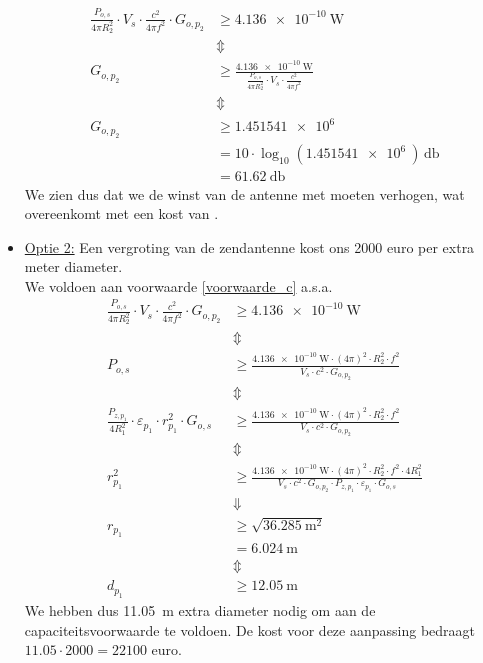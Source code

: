 \documentclass[kulak]{kulakarticle}
\begin{document}
\begin{itemize}
		\begin{align*}
			\frac{P_{o,s}}{4\pi R_2^2} \cdot V_s \cdot \frac{c^2}{4\pi f^2}\cdot G_{o,p_2}& \geq \SI{4.136e-10}{\watt} \\
			& \Updownarrow \\
			G_{o,p_2} & \geq \frac{\SI{4.136e-10}{\watt}}{\frac{P_{o,s}}{4\pi R_2^2} \cdot V_s \cdot \frac{c^2}{4\pi f^2}} \\
			& \Updownarrow \\
			G_{o,p_2} & \geq \SI{1.451541e6}{} \\
					& = 10 \cdot \log_{10}(\SI{1.451541e6}{}) \,\unit{\decibel}\\
					& = \SI{61.62}{\decibel}
		\end{align*}
		We zien dus dat we de winst van de antenne met  moeten verhogen, wat overeenkomt met een kost van .

		\newpage
		\item \underline{Optie 2:} Een vergroting van de zendantenne kost ons 2000 euro per extra meter diameter. \\We voldoen aan voorwaarde \eqref{voorwaarde_c} a.s.a.
		\begin{align*}
			\frac{P_{o,s}}{4\pi R_2^2} \cdot V_s \cdot \frac{c^2}{4\pi f^2}\cdot G_{o,p_2}& \geq \SI{4.136e-10}{\watt} \\
			& \Updownarrow \\
			P_{o,s} &\geq \frac{\SI{4.136e-10}{\watt} \cdot (4\pi)^2 \cdot R_2^2 \cdot f^2}{V_s \cdot c^2 \cdot G_{o,p_2}} \\
			& \Updownarrow \\
			\frac{P_{z,p_1}}{4 R_1^2}\cdot \varepsilon_{p_1} \cdot  r_{p_1}^2 \cdot G_{o,s} &\geq \frac{\SI{4.136e-10}{\watt} \cdot (4\pi)^2 \cdot R_2^2 \cdot f^2}{V_s \cdot c^2 \cdot G_{o,p_2}} \\
			& \Updownarrow \\
			r_{p_1}^2 &\geq \frac{\SI{4.136e-10}{\watt} \cdot (4\pi)^2 \cdot R_2^2 \cdot f^2 \cdot 4R_1^2}{V_s \cdot c^2 \cdot G_{o,p_2} \cdot P_{z,p_1} \cdot \varepsilon_{p_1} \cdot G_{o,s} } \\
			& \Downarrow \\
			r_{p_1} &\geq \sqrt{\SI{36.285}{\meter^2}} \\
			&= \SI{6.024}{\meter}\\
			& \Updownarrow \\
			d_{p_1} &\geq \SI{12.05}{\meter}
		\end{align*}
		We hebben dus \SI{11.05}{\meter} extra diameter nodig om aan de capaciteitsvoorwaarde te voldoen. De kost voor deze aanpassing bedraagt \(11.05 \cdot 2000 = \boxed{22 100 \text{ euro}}\).


\end{itemize}
\end{document}
